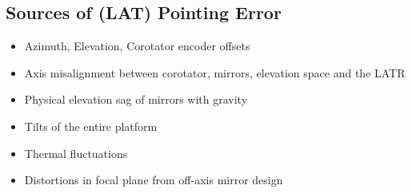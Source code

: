\begin{table}[h!]
\label{tab:goals}
\end{table}



\subsection{Sources of (LAT) Pointing Error}

\begin{itemize}
    \item Azimuth, Elevation, Corotator encoder offsets
    \item Axis misalignment between corotator, mirrors, elevation space and the LATR
    \item Physical elevation sag of mirrors with gravity
    \item Tilts of the entire platform
    \item Thermal fluctuations
    \item Distortions in focal plane from off-axis mirror design
\end{itemize}




\citep{abitbol_simons_2025} \citep{aiola_atacama_2025}